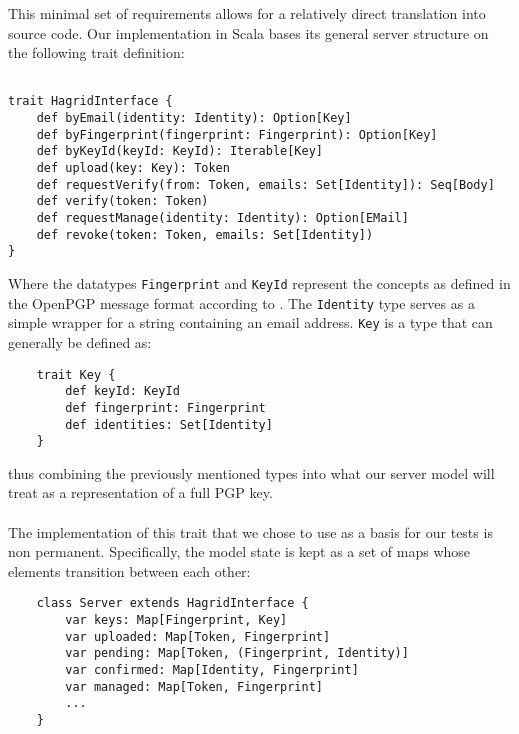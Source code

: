 This minimal set of requirements allows for a relatively direct translation into source code. Our implementation in Scala bases its general server structure on the following trait definition: 
\begin{verbatim}

trait HagridInterface {
    def byEmail(identity: Identity): Option[Key]
    def byFingerprint(fingerprint: Fingerprint): Option[Key]
    def byKeyId(keyId: KeyId): Iterable[Key]
    def upload(key: Key): Token
    def requestVerify(from: Token, emails: Set[Identity]): Seq[Body]
    def verify(token: Token)
    def requestManage(identity: Identity): Option[EMail]
    def revoke(token: Token, emails: Set[Identity])
}
\end{verbatim}
\label{def:HagridInterface}
Where the datatypes \texttt{Fingerprint} and \texttt{KeyId} represent the concepts as defined in the OpenPGP message format according to \cite{callas1998openpgp}. The \texttt{Identity} type serves as a simple wrapper for a string containing an email address. \texttt{Key} is a type that can generally be defined as: 
\begin{verbatim}
    trait Key {
        def keyId: KeyId
        def fingerprint: Fingerprint
        def identities: Set[Identity]
    }
\end{verbatim}
thus combining the previously mentioned types into what our server model will treat as a representation of a full PGP key.
\\ \\
The implementation of this trait that we chose to use as a basis for our tests is non permanent. Specifically, the model state is kept as a set of maps whose elements transition between each other: 
\begin{verbatim}
    class Server extends HagridInterface {
        var keys: Map[Fingerprint, Key]
        var uploaded: Map[Token, Fingerprint]
        var pending: Map[Token, (Fingerprint, Identity)]
        var confirmed: Map[Identity, Fingerprint]
        var managed: Map[Token, Fingerprint]
        ...
    }
\end{verbatim}

